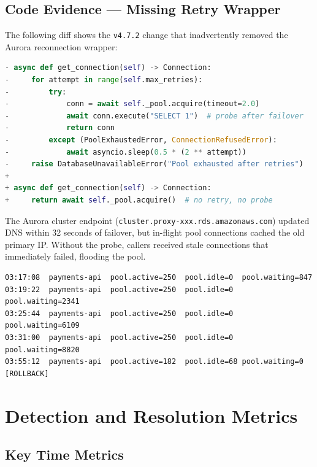\documentclass[11pt,a4paper]{article}
\begin{document}
\subsection{Code Evidence --- Missing Retry Wrapper}

The following diff shows the \texttt{v4.7.2} change that inadvertently removed
the Aurora reconnection wrapper:

\begin{lstlisting}[language=Python, caption={\texttt{src/db/pool.py} --- diff v4.7.1 to v4.7.2}]
- async def get_connection(self) -> Connection:
-     for attempt in range(self.max_retries):
-         try:
-             conn = await self._pool.acquire(timeout=2.0)
-             await conn.execute("SELECT 1")  # probe after failover
-             return conn
-         except (PoolExhaustedError, ConnectionRefusedError):
-             await asyncio.sleep(0.5 * (2 ** attempt))
-     raise DatabaseUnavailableError("Pool exhausted after retries")
+
+ async def get_connection(self) -> Connection:
+     return await self._pool.acquire()  # no retry, no probe
\end{lstlisting}

The Aurora cluster endpoint (\texttt{cluster.proxy-xxx.rds.amazonaws.com})
updated DNS within 32 seconds of failover, but in-flight pool connections
cached the old primary IP. Without the probe, callers received stale
connections that immediately failed, flooding the pool.

\begin{lstlisting}[caption={CloudWatch --- connection pool metric (03:17--03:55 UTC)}]
03:17:08  payments-api  pool.active=250  pool.idle=0  pool.waiting=847
03:19:22  payments-api  pool.active=250  pool.idle=0  pool.waiting=2341
03:25:44  payments-api  pool.active=250  pool.idle=0  pool.waiting=6109
03:31:00  payments-api  pool.active=250  pool.idle=0  pool.waiting=8820
03:55:12  payments-api  pool.active=182  pool.idle=68 pool.waiting=0  [ROLLBACK]
\end{lstlisting}

\section{Detection and Resolution Metrics}

\subsection{Key Time Metrics}
\end{document}
